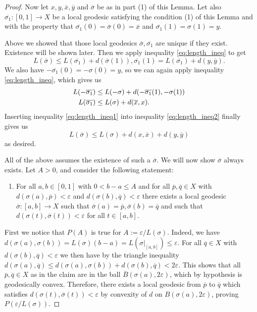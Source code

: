 \documentclass[11pt, a4paper, oneside]{memoir}
\theoremstyle{plain}\newtheorem{theorem}[subsection]{Theorem}
\theoremstyle{definition}
\begin{document}
\begin{proof}
Now let \(x,y,\overline{x},\overline{y}\) and \(\overline{\sigma}\) be as in part (1) of this Lemma. Let also \(\overline{\sigma_1}:[0,1]\to X\) be a local geodesic satisfying the condition (1) of this Lemma and with the property that $\overline{\sigma_1}(0)=\overline{\sigma}(0)=\overline{x}$ and $\overline{\sigma_1}(1)=\sigma(1)=y$.

Above we showed that those local geodesics $\overline{\sigma}, \overline{\sigma_1}$ are unique if they exist. Existence will be shown later. Then we apply inequality \eqref{eq:length_ineq} to get 
\begin{equation}\label{eq:length_ineq1}
L(\overline{\sigma})\leq L(\overline{\sigma_1})+d(\overline{\sigma}(1)),\overline{\sigma_1}(1)=L(\overline{\sigma_1})+d(y,\overline{y}).
\end{equation}
We also have \(-\overline{\sigma_1}(0)=-\sigma(0)=y\), so we can again apply inequality \eqref{eq:length_ineq}, which gives us \begin{align}
L(-\overline{\sigma_1})&\leq L(-\sigma)+d(-\overline{\sigma_1}(1),-\sigma(1)) \notag\\
L(\overline{\sigma_1})&\leq L(\sigma)+d(\overline{x},x)\label{eq:length_ineq2}.
\end{align}
Inserting inequality \eqref{eq:length_ineq1} into inequality \eqref{eq:length_ineq2} finally gives us
\[L(\overline{\sigma})\leq L(\sigma)+d(x,\overline{x})+d(y,\overline{y})\]
as desired.

\medskip
All of the above assumes the existence of such a \(\overline{\sigma}\).
We will now show \(\overline{\sigma}\) always exists.
Let \(A>0\), and consider the following statement:
\begin{enumerate}
    \item[\(P(A)\)]
For all \(a,b\in [0,1]\) with \(0<b-a\leq A\) and for all \(\overline{p},\overline{q}\in X\) with \(d(\sigma(a),\overline{p})<\varepsilon\) and \(d(\sigma(b),\overline{q})<\varepsilon\) there exists a local geodesic \(\overline{\sigma}:[a,b]\to X\) such that \(\overline{\sigma}(a)=\overline{p},\overline{\sigma}(b)=\overline{q}\) and such that \(d(\sigma(t),\overline{\sigma}(t))<\varepsilon\) for all \(t\in [a,b]\).
\end{enumerate}


First we notice that $P(A)$  is true for \(A:=\varepsilon/L(\sigma)\). Indeed, we have 
\(d(\sigma(a),\sigma(b))=L(\sigma)(b-a)=L(\sigma|_{[a,b]})\leq\varepsilon\).
For all \(\overline{q}\in X\) with \(d(\sigma(b),\overline{q})<\varepsilon\) we then have by the triangle inequality \(d(\sigma(a),\overline{q})\leq d(\sigma(a),\sigma(b))+d(\sigma(b),\overline{q})<2\varepsilon\).
This shows that all \(\overline{p},\overline{q}\in X\) as in the claim are in the ball \(\overline{B}(\sigma(a),2\varepsilon)\), which by hypothesis is geodesically convex.
Therefore, there exists a local geodesic from \(\overline{p}\) to \(\overline{q}\) which satisfies \(d(\sigma(t),\overline{\sigma}(t))<\varepsilon\) by convexity of \(d\) on \(B(\sigma(a),2\varepsilon)\), proving \(P(\varepsilon/L(\sigma))\).


\end{proof}
\end{document}
